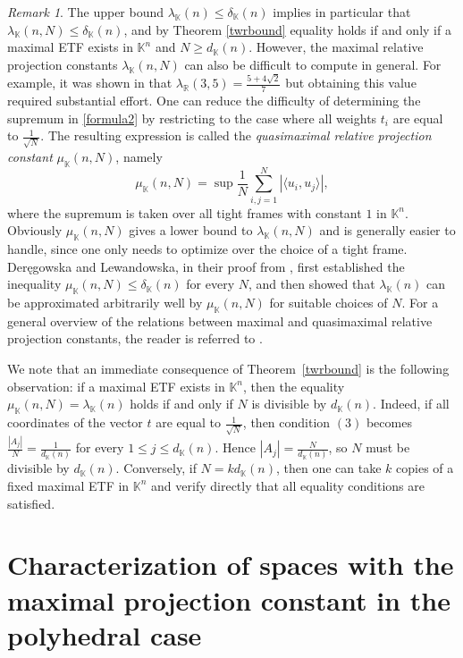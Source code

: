 \documentclass[12pt, reqno]{amsart}
\theoremstyle{definition}
\theoremstyle{remark}
\newtheorem{remark}[twr]{Remark}
\numberwithin{equation}{section}
\begin{document}
\begin{remark}
The upper bound $\lambda_{\mathbb{K}}(n)\leq \delta_{\mathbb{K}}(n)$ implies in particular that $\lambda_{\mathbb{K}}(n,N)\leq \delta_{\mathbb{K}}(n)$, and by Theorem \ref{twrbound} equality holds if and only if a maximal ETF exists in $\mathbb{K}^n$ and $N\ge d_{\mathbb{K}}(n)$. However, the maximal relative projection constants $\lambda_{\mathbb{K}}(n,N)$ can also be difficult to compute in general. For example, it was shown in \cite{chalmerslewicki} that $\lambda_{\mathbb{R}}(3, 5) = \frac{5+4\sqrt{2}}{7}$ but obtaining this value required substantial effort. One can reduce the difficulty of determining the supremum in \eqref{formula2} by restricting to the case where all weights $t_i$ are equal to $\frac1{\sqrt N}$. The resulting expression is called the \emph{quasimaximal relative projection constant} $\mu_{\mathbb{K}}(n,N)$, namely
$$\mu_{\mathbb{K}}(n, N) =\sup \frac{1}{N} \sum_{i, j=1}^{N} |\langle u_i, u_j \rangle|,$$
where the supremum is taken over all tight frames with constant $1$ in $\mathbb{K}^n$. Obviously $\mu_{\mathbb{K}}(n, N)$ gives a lower bound to $\lambda_{\mathbb{K}}(n, N)$ and is generally easier to handle, since one only needs to optimize over the choice of a tight frame. Deręgowska and Lewandowska, in their proof from \cite{deregowskalewandowska}, first established the inequality  $\mu_{\mathbb{K}}(n,N)\leq \delta_{\mathbb{K}}(n)$ for every $N$, and then showed that $\lambda_{\mathbb{K}}(n)$ can be approximated arbitrarily well by $\mu_{\mathbb{K}}(n,N)$ for suitable choices of $N$. For a general overview of the relations between maximal and quasimaximal relative projection constants, the reader is referred to \cite{foucartskrzypek}. 

We note that an immediate consequence of Theorem~\ref{twrbound} is the following observation: if a maximal ETF exists in $\mathbb{K}^n$, then the equality $\mu_{\mathbb{K}}(n,N)=\lambda_{\mathbb{K}}(n)$ holds if and only if $N$ is divisible by $d_{\mathbb{K}}(n)$. Indeed, if all coordinates of the vector $t$ are equal to $\frac1{\sqrt N}$, then condition $(3)$ becomes $\frac{|A_j|}{N} = \frac1{d_{\mathbb{K}}(n)}$ for every $1\le j\le d_{\mathbb{K}}(n)$. Hence $|A_j|=\frac{N}{d_{\mathbb{K}}(n)}$, so $N$ must be divisible by $d_{\mathbb{K}}(n)$. Conversely, if $N=kd_{\mathbb{K}}(n)$, then one can take $k$ copies of a fixed maximal ETF in $\mathbb{K}^n$ and verify directly that all equality conditions are satisfied.


\end{remark}

\section{Characterization of spaces with the maximal projection constant in the polyhedral case}
\label{seccharpolyhedral}
\end{document}

